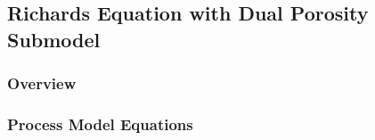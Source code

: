 
\subsection{Richards Equation with Dual Porosity Submodel}
\label{sec:dual-porosity-richards-equation}

\subsubsection{Overview}
\label{sec:sual-porosity-richards-overview}

\subsubsection{Process Model Equations} 
\label{sec:sual-porosity-richards-model-equations}
